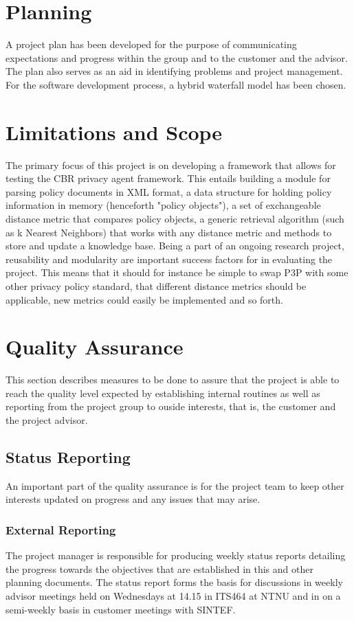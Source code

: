 \section{Planning}
A project plan has been developed for the purpose of communicating expectations and progress within the group and to the customer and the advisor. The plan also serves as an aid in identifying problems and project management. For the software development process, a hybrid waterfall model has been chosen.


\section{Limitations and Scope}
The primary focus of this project is on developing a framework that allows for testing the CBR privacy agent framework. This entails building a module for parsing policy documents in XML format, a data structure for holding policy information in memory (henceforth "policy objects"), a set of exchangeable distance metric that compares policy objects, a generic retrieval algorithm (such as k Nearest Neighbors) that works with any distance metric and methods to store and update a knowledge base. Being a part of an ongoing research project, reusability and modularity are important success factors for in evaluating the project. This means that it should for instance be simple to swap P3P with some other privacy policy standard, that different distance metrics should be applicable, new metrics could easily be implemented and so forth.


\section{Quality Assurance}

This section describes measures to be done to assure that the project is able to reach the quality level expected by establishing internal routines as well as reporting from the project group to ouside interests, that is, the customer and the project advisor.

\subsection{Status Reporting}

An important part of the quality assurance is for the project team to keep other interests updated on progress and any issues that may arise.

\subsubsection{External Reporting}
The project manager is responsible for producing weekly status reports detailing the progress towards the objectives that are established in this and other planning documents. The status report forms the basis for discussions in weekly advisor meetings held on Wednesdays at 14.15 in ITS464 at NTNU and in on a semi-weekly basis in customer meetings with SINTEF.

